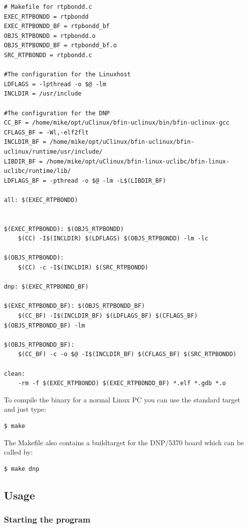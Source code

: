 \documentclass[a4paper]{book}%
\begin{document}
\begin{verbatim}
# Makefile for rtpbondd.c
EXEC_RTPBONDD = rtpbondd
EXEC_RTPBONDD_BF = rtpbondd_bf
OBJS_RTPBONDD = rtpbondd.o
OBJS_RTPBONDD_BF = rtpbondd_bf.o
SRC_RTPBONDD = rtpbondd.c

#The configuration for the Linuxhost
LDFLAGS = -lpthread -o $@ -lm
INCLDIR = /usr/include

#The configuration for the DNP
CC_BF = /home/mike/opt/uClinux/bfin-uclinux/bin/bfin-uclinux-gcc
CFLAGS_BF = -Wl,-elf2flt
INCLDIR_BF = /home/mike/opt/uClinux/bfin-uclinux/bfin-uclinux/runtime/usr/include/
LIBDIR_BF = /home/mike/opt/uClinux/bfin-linux-uclibc/bfin-linux-uclibc/runtime/lib/
LDFLAGS_BF = -pthread -o $@ -lm -L$(LIBDIR_BF)
		
all: $(EXEC_RTPBONDD) 


$(EXEC_RTPBONDD): $(OBJS_RTPBONDD)
	$(CC) -I$(INCLDIR) $(LDFLAGS) $(OBJS_RTPBONDD) -lm -lc

$(OBJS_RTPBONDD):
	$(CC) -c -I$(INCLDIR) $(SRC_RTPBONDD)
	
dnp: $(EXEC_RTPBONDD_BF)

$(EXEC_RTPBONDD_BF): $(OBJS_RTPBONDD_BF)
	$(CC_BF) -I$(INCLDIR_BF) $(LDFLAGS_BF) $(CFLAGS_BF) $(OBJS_RTPBONDD_BF) -lm

$(OBJS_RTPBONDD_BF):
	$(CC_BF) -c -o $@ -I$(INCLDIR_BF) $(CFLAGS_BF) $(SRC_RTPBONDD)

clean:
	-rm -f $(EXEC_RTPBONDD) $(EXEC_RTPBONDD_BF) *.elf *.gdb *.o
\end{verbatim}

To compile the binary for a normal Linux PC you can use the standard target and just type:
\begin{verbatim}
$ make
\end{verbatim}

The Makefile also contains a buildtarget for the DNP/5370 board which can be called by:
\begin{verbatim}
$ make dnp
\end{verbatim}

\subsection{Usage}
\subsubsection{Starting the program}
\end{document}
